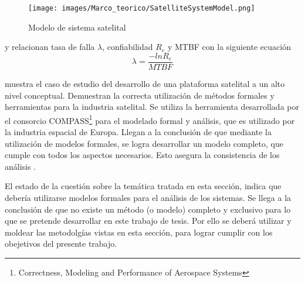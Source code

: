 \begin{figure}[H]
  \centering
  \texttt{[image: images/Marco\_teorico/SatelliteSystemModel.png]}
  \caption{Modelo de sistema satelital \citep{Hoque15}}  
  \label{fig:SystemSatellite} 
\end{figure}

\cite{Hoque15} y \cite{Peng13} relacionan tasa de falla $\lambda$, confiabilidad $R_e$ y \ac{MTBF} con la siguiente ecuación $$\lambda = \frac{-ln R_e}{MTBF}$$

\cite{Esteve12} muestra el caso de estudio del desarrollo de una plataforma satelital a un alto nivel conceptual. Demuestran la correcta utilización de métodos formales y herramientas para la industria satelital. Se utiliza la herramienta desarrollada por el consorcio COMPASS\footnote{Correctness, Modeling and Performance of Aerospace Systems} para el modelado formal y análisis, que es utilizado por la industria espacial de Europa. Llegan a la conclusión de que mediante la utilización de modelos formales, se logra desarrollar un modelo completo, que cumple con todos los aspectos necesarios. Esto asegura la consistencia de los análisis \citep{Esteve12}.

El estado de la cuestión sobre la temática tratada en esta sección, indica que debería utilizarse modelos formales para el análisis de los sistemas. Se llega a la conclusión de que no existe un método (o modelo) completo y exclusivo para lo que se pretende desarrollar en este trabajo de tesis. Por ello se deberá utilizar y moldear las metodolgías vistas en esta sección, para lograr cumplir con los obejetivos del presente trabajo. 


